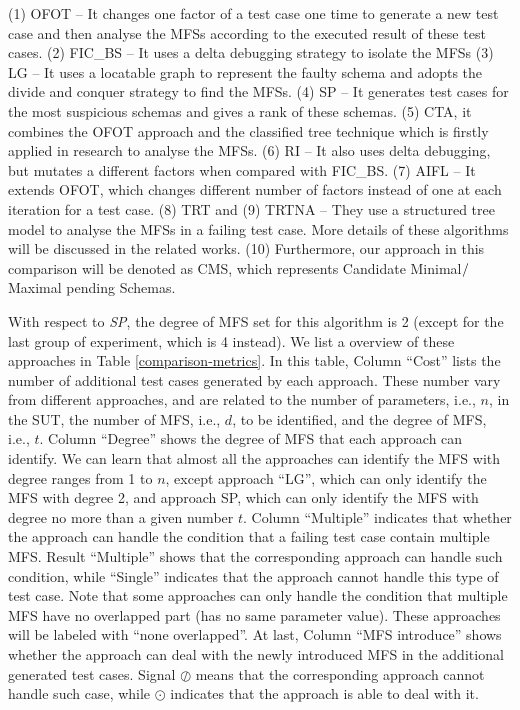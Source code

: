 \documentclass{sig-alternate-05-2015}
\begin{document}
{{{{(1) OFOT \cite{nie2011minimal} -- It changes one factor of a test case one time to generate a new test case and then analyse the MFSs according to the executed result of these test cases. (2) FIC\_BS \cite{zhang2011characterizing} -- It uses a delta debugging strategy to isolate the MFSs (3) LG \cite{martinez2008algorithms,martinez2009locating} -- It uses a locatable graph to represent the faulty schema and adopts the divide and conquer strategy to find the MFSs. (4) SP\cite{ghandehari2012identifying} -- It generates test cases for the most suspicious schemas and gives a rank of these schemas. (5) CTA\cite{shakya2012isolating}, it combines the OFOT approach and the classified tree technique which is firstly applied in research \cite{yilmaz2006covering}  to analyse the MFSs. (6) RI \cite{li2012improved} -- It also uses delta debugging, but mutates a different factors  when compared with FIC\_BS. (7) AIFL \cite{wang2010adaptive} -- It extends OFOT, which changes different number of factors instead of one at each iteration for a test case. (8) TRT \cite{niu2013identifying} and (9) TRTNA \cite{niu2013identifying} --  They use a structured tree model to analyse the MFSs in a failing test case.  More details of these algorithms will be discussed in the related works. (10) Furthermore, our approach in this comparison will be denoted as CMS, which represents Candidate Minimal$\//$Maximal pending Schemas.

With respect to \emph{SP}, the degree of MFS set for this algorithm is 2 (except for the last group of experiment, which is 4 instead). We list a overview of these approaches in Table \ref{comparison-metrics}. In this table, Column ``Cost'' lists the number of additional test cases generated by each approach. These number vary from different approaches, and are related to the number of parameters, i.e., $n$, in the SUT, the number of MFS, i.e., $d$, to be identified, and the degree of MFS, i.e., $t$. Column ``Degree'' shows the degree of MFS that each approach can identify. We can learn that almost all the approaches can identify the MFS with degree ranges from 1 to $n$, except approach ``LG'', which can only identify the MFS with degree 2, and approach SP, which can only identify the MFS with degree no more than a given number $t$.  Column ``Multiple'' indicates that whether the approach can handle the condition that a failing test case contain multiple MFS. Result ``Multiple'' shows that the corresponding approach can handle such condition, while ``Single'' indicates that the approach cannot handle this type of test case. Note that some approaches can only handle the condition that multiple MFS have no overlapped part (has no same parameter value). These approaches will be labeled with ``none overlapped''.
At last, Column ``MFS introduce'' shows whether the approach can deal with the newly introduced MFS in the additional generated test cases. Signal $\oslash$ means that the corresponding approach cannot handle such case, while $\odot$ indicates that the approach is able to deal with it.

}}}}
\end{document}
